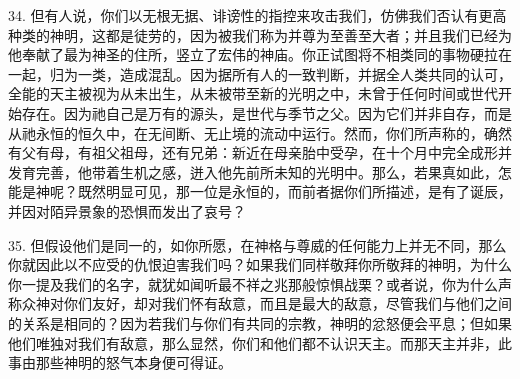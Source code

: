 34. 但有人说，你们以无根无据、诽谤性的指控来攻击我们，仿佛我们否认有更高种类的神明，这都是徒劳的，因为被我们称为并尊为至善至大者；并且我们已经为他奉献了最为神圣的住所，竖立了宏伟的神庙。你正试图将不相类同的事物硬拉在一起，归为一类，造成混乱。因为据所有人的一致判断，并据全人类共同的认可，全能的天主被视为从未出生，从未被带至新的光明之中，未曾于任何时间或世代开始存在。因为祂自己是万有的源头，是世代与季节之父。因为它们并非自存，而是从祂永恒的恒久中，在无间断、无止境的流动中运行。然而，你们所声称的，确然有父有母，有祖父祖母，还有兄弟：新近在母亲胎中受孕，在十个月中完全成形并发育完善，他带着生机之感，迸入他先前所未知的光明中。那么，若果真如此，怎能是神呢？既然明显可见，那一位是永恒的，而前者据你们所描述，是有了诞辰，并因对陌异景象的恐惧而发出了哀号？\par

35. 但假设他们是同一的，如你所愿，在神格与尊威的任何能力上并无不同，那么你就因此以不应受的仇恨迫害我们吗？如果我们同样敬拜你所敬拜的神明，为什么你一提及我们的名字，就犹如闻听最不祥之兆那般惊惧战栗？或者说，你为什么声称众神对你们友好，却对我们怀有敌意，而且是最大的敌意，尽管我们与他们之间的关系是相同的？因为若我们与你们有共同的宗教，神明的忿怒便会平息；但如果他们唯独对我们有敌意，那么显然，你们和他们都不认识天主。而那天主并非，此事由那些神明的怒气本身便可得证。\par

